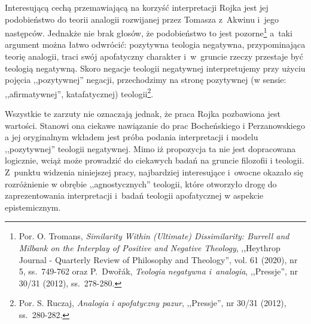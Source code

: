 Interesującą cechą przemawiającą na korzyść interpretacji Rojka jest jej podobieństwo
do teorii analogii rozwijanej przez Tomasza z~Akwinu i~jego następców. Jednakże nie brak
głosów, że podobieństwo to jest pozorne\footnote{Por.
O. Tromans, \textit{Similarity Within (Ultimate) Dissimilarity: Burrell and Milbank on the Interplay of Positive and Negative Theology}, ,,Heythrop Journal - Quarterly Review of Philosophy and Theology'', vol. 61 (2020), nr 5, ss.~749-762
oraz
P.~Dwořák, \textit{Teologia negatywna i~analogia}, ,,Pressje'', nr 30/31 (2012),
ss.~278-280.}
a~taki argument można łatwo odwrócić: pozytywna teologia negatywna,
przypominająca teorię analogii, traci swój apofatyczny charakter i~w~gruncie rzeczy przestaje być teologią negatywną.
Skoro negacje teologii negatywnej interpretujemy przy
użyciu pojęcia ,,pozytywnej'' negacji, przechodzimy na stronę
pozytywnej (w sensie: ,,afirmatywnej'', katafatycznej) teologii\footnote{Por. S.
Ruczaj, \textit{Analogia i apofatyczny pazur}, ,,Pressje'', nr 30/31 (2012),
ss.~280-282.}.

Wszystkie te zarzuty nie oznaczają jednak, że praca Rojka pozbawiona jest
wartości. Stanowi ona ciekawe nawiązanie do prac Bocheńskiego i Perzanowskiego a jej oryginalnym wkładem jest
próba podania interpretacji i modelu ,,pozytywnej'' teologii negatywnej. Mimo iż propozycja ta nie jest dopracowana logicznie, wciąż może prowadzić do ciekawych badań na gruncie filozofii i teologii. Z~punktu widzenia
niniejszej pracy, najbardziej interesujące i~owocne okazało się rozróżnienie w obrębie ,,agnostycznych'' teologii, które otworzyło drogę do zaprezentowania interpretacji i~badań teologii apofatycznej w aspekcie epistemicznym.


